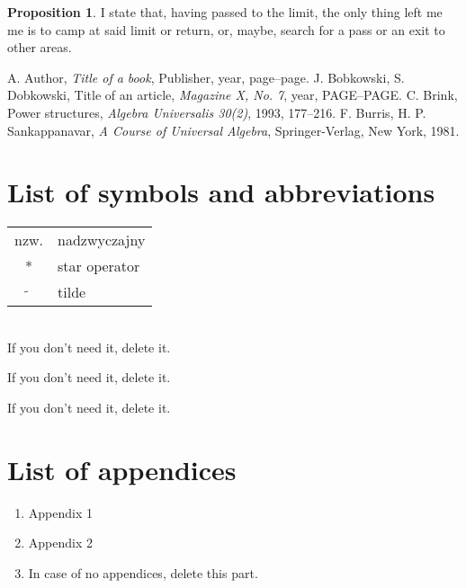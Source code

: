 \documentclass[a4paper,11pt,twoside]{report}
\theoremstyle{definition}
\newtheorem{proposition}[theorem]{Proposition}
\begin{document}
\begin{proposition}
	I state that, having passed to the limit, the only thing left me me is to camp at said limit or return, or, maybe, search for a pass or an exit to other areas.
\end{proposition}







\begin{thebibliography}{20} %

 A. Author, \emph{Title of a book}, Publisher, year, page--page.
 J. Bobkowski, S. Dobkowski, Title of an article, \emph{Magazine X, No. 7}, year, PAGE--PAGE.
 C. Brink, Power structures, \emph{Algebra Universalis 30(2)}, 1993, 177--216.
 F. Burris, H. P. Sankappanavar, \emph{A Course of Universal Algebra}, Springer-Verlag, New York, 1981.
\end{thebibliography}
\thispagestyle{empty}



\chapter*{List of symbols and abbreviations}

\begin{tabular}{cl}
nzw. & nadzwyczajny \\
* & star operator \\
$\widetilde{}$ & tilde 
\end{tabular}
\\
If you don't need it, delete it.
\thispagestyle{empty}


\listoffigures
\thispagestyle{empty}
If you don't need it, delete it.


\renewcommand{\listtablename}{Spis tabel}
\listoftables
\thispagestyle{empty}
If you don't need it, delete it.

\chapter*{List of appendices}
\begin{enumerate}
\item Appendix 1
\item Appendix 2
\item In case of no appendices, delete this part.
\end{enumerate}
\thispagestyle{empty}
\end{document}
